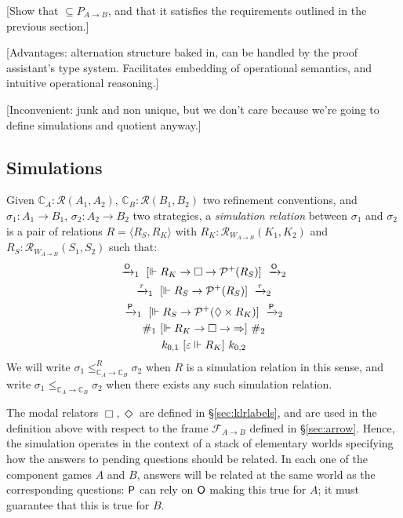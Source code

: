 [Show that $\subseteq P_{A \rightarrow B}$,
and that it satisfies the requirements outlined
in the previous section.]

[Advantages: alternation structure baked in,
can be handled by the proof assistant's type system.
Facilitates embedding of operational semantics,
and intuitive operational reasoning.]

[Inconvenient: junk and non unique,
but we don't care because we're going to
define simulations and quotient anyway.]



\subsection{Simulations} %

\begin{definition} %
Given
$\mathbb{C}_A : \mathcal{R}(A_1, A_2)$,
$\mathbb{C}_B : \mathcal{R}(B_1, B_2)$
two refinement conventions, and
$\sigma_1 : A_1 \rightarrow B_1$,
$\sigma_2 : A_2 \rightarrow B_2$
two strategies,
a \emph{simulation relation} between $\sigma_1$ and $\sigma_2$
is a pair of relations $R = \langle R_S, R_K \rangle$ with
$R_K : \mathcal{R}_{W_{\!A \rightarrow B}}(K_1, K_2)$ and
$R_S : \mathcal{R}_{W_{\!A \rightarrow B}}(S_1, S_2)$
such that:
\begin{gather*}
  \xrightarrow{ \mathsf{O} }_1
  \ [{\Vdash R_K \rightarrow \Box \rightarrow \mathcal{P}^+(R_S)}]\ 
  \xrightarrow{ \mathsf{O} }_2
  \\
  \xrightarrow{\tau}_1
  \ [{\Vdash R_S \rightarrow \mathcal{P}^+(R_S)}]\ 
  \xrightarrow{\tau}_2
  \\
  \xrightarrow{ \mathsf{P} }_1
  \ [{\Vdash R_S \rightarrow \mathcal{P}^+(\Diamond \times R_K)}]\ 
  \xrightarrow{ \mathsf{P} }_2
  \\
  \#_1
  \ [{\Vdash R_K \rightarrow \Box \rightarrow {\Rightarrow}}]\ 
  \#_2
  \\
  k_{0,1} \ [{\varepsilon \Vdash R_K}]\  k_{0,2}
\end{gather*}
We will write
$\sigma_1 \le_{\mathbb{C}_A \rightarrow \mathbb{C}_B}^R \sigma_2$
when $R$ is a simulation relation in this sense, and write
$\sigma_1 \le_{\mathbb{C}_A \rightarrow \mathbb{C}_B} \sigma_2$
when there exists any such simulation relation.
\end{definition}

The modal relators $\Box, \Diamond$ are defined in \S\ref{sec:klrlabels},
and are used in the definition above
with respect to the frame $\mathcal{F}_{A \rightarrow B}$
defined in \S\ref{sec:arrow}.
Hence, the simulation operates in the context of
a stack of elementary worlds
specifying how the answers to pending questions
should be related.
In each one of the component games $A$ and $B$,
answers will be related at the same world as the corresponding questions:
$ \mathsf{P} $ can rely on $ \mathsf{O} $ making this true for $A$;
it must guarantee that this is true for $B$.

